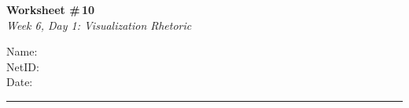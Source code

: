 \documentclass[11pt]{article}
\begin{document}
\noindent
\begin{minipage}[t]{0.55\textwidth}
  \vspace{0pt}
  {\LARGE \textbf{Worksheet \#\,10}} \\[0.3em]
  {\large \textit{Week 6, Day 1: Visualization Rhetoric}}
\end{minipage}
\hfill
\begin{minipage}[t]{0.40\textwidth}
  \vspace{0pt}
  \begin{mdframed}[linecolor=black, linewidth=1pt, innertopmargin=10pt, innerbottommargin=10pt]
    \small
    \vspace{0.4cm}
    Name: \underline{\hspace{4.5cm}} \\[1em]
    NetID: \underline{\hspace{4.3cm}} \\[1em]
    Date: \underline{\hspace{4.4cm}} \\
  \end{mdframed}
\end{minipage}

\vspace{1em}
\noindent\rule{\linewidth}{1pt}
\vspace{0.2em}
\end{document}
